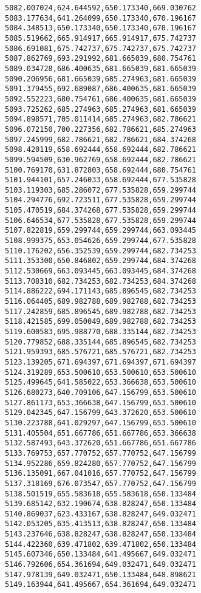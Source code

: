 \documentclass[11pt]{article}
\begin{document}
\begin{Verbatim}[commandchars=\\\{\}]
5082.007024,624.644592,650.173340,669.030762
5083.177634,641.264099,650.173340,670.196167
5084.348513,650.173340,650.173340,670.196167
5085.519662,665.914917,665.914917,675.742737
5086.691081,675.742737,675.742737,675.742737
5087.862769,693.291992,681.665039,680.754761
5089.034728,686.400635,681.665039,681.665039
5090.206956,681.665039,685.274963,681.665039
5091.379455,692.689087,686.400635,681.665039
5092.552223,680.754761,686.400635,681.665039
5093.725262,685.274963,685.274963,681.665039
5094.898571,705.011414,685.274963,682.786621
5096.072150,700.227356,682.786621,685.274963
5097.245999,682.786621,682.786621,684.374268
5098.420119,658.692444,658.692444,682.786621
5099.594509,630.962769,658.692444,682.786621
5100.769170,631.872803,658.692444,680.754761
5101.944101,657.246033,658.692444,677.535828
5103.119303,685.286072,677.535828,659.299744
5104.294776,692.723511,677.535828,659.299744
5105.470519,684.374268,677.535828,659.299744
5106.646534,677.535828,677.535828,659.299744
5107.822819,659.299744,659.299744,663.093445
5108.999375,653.054626,659.299744,677.535828
5110.176202,656.352539,659.299744,682.734253
5111.353300,650.846802,659.299744,684.374268
5112.530669,663.093445,663.093445,684.374268
5113.708310,682.734253,682.734253,684.374268
5114.886222,694.171143,685.896545,682.734253
5116.064405,689.982788,689.982788,682.734253
5117.242859,685.896545,689.982788,682.734253
5118.421585,699.050049,689.982788,682.734253
5119.600583,695.988770,688.335144,682.734253
5120.779852,688.335144,685.896545,682.734253
5121.959393,685.576721,685.576721,682.734253
5123.139205,671.694397,671.694397,671.694397
5124.319289,653.500610,653.500610,653.500610
5125.499645,641.585022,653.366638,653.500610
5126.680273,640.709106,647.156799,653.500610
5127.861173,653.366638,647.156799,653.500610
5129.042345,647.156799,643.372620,653.500610
5130.223788,641.029297,647.156799,653.500610
5131.405504,651.667786,651.667786,653.366638
5132.587493,643.372620,651.667786,651.667786
5133.769753,657.770752,657.770752,647.156799
5134.952286,659.824280,657.770752,647.156799
5136.135091,667.041016,657.770752,647.156799
5137.318169,676.073547,657.770752,647.156799
5138.501519,655.583618,655.583618,650.133484
5139.685142,632.190674,638.828247,650.133484
5140.869037,623.433167,638.828247,649.032471
5142.053205,635.413513,638.828247,650.133484
5143.237646,638.828247,638.828247,650.133484
5144.422360,639.471802,639.471802,650.133484
5145.607346,650.133484,641.495667,649.032471
5146.792606,654.361694,649.032471,649.032471
5147.978139,649.032471,650.133484,648.898621
5149.163944,641.495667,654.361694,649.032471

\end{Verbatim}
\end{document}
